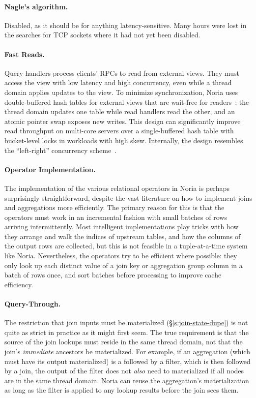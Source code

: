 \paragraph{Nagle's algorithm.} Disabled, as it should be for anything
latency-sensitive. Many hours were lost in the searches for TCP sockets where it
had not yet been disabled.

\paragraph{Fast Reads.}
Query handlers process clients' RPCs to read from external views. They must
access the view with low latency and high concurrency, even while a thread
domain applies updates to the view. To minimize synchronization, Noria uses
double-buffered hash tables for external views that are wait-free for
readers~\cite{evmap}: the thread domain updates one table while read handlers
read the other, and an atomic pointer swap exposes new writes. This design can
significantly improve read throughput on multi-core servers over a
single-buffered hash table with bucket-level locks in workloads with high skew.
Internally, the design resembles the ``left-right'' concurrency
scheme~\cite{left-right}.

\paragraph{Operator Implementation.}
The implementation of the various relational operators in Noria is perhaps
surprisingly straightforward, despite the vast literature on how to implement
joins and aggregations more efficiently. The primary reason for this is that the
operators must work in an incremental fashion with small batches of rows
arriving intermittently. Most intelligent implementations play tricks with how
they arrange and walk the indices of upstream tables, and how the columns of the
output rows are collected, but this is not feasible in a tuple-at-a-time system
like Noria. Nevertheless, the operators try to be efficient where possible: they
only look up each distinct value of a join key or aggregation group column in a
batch of rows once, and sort batches before processing to improve cache
efficiency.

\paragraph{Query-Through.}
The restriction that join inputs must be materialized
(\S\ref{s:join-state-dupe}) is not quite as strict in practice as it might first
seem. The true requirement is that the source of the join lookups must reside in
the same thread domain, not that the join's \emph{immediate} ancestors be
materialized. For example, if an aggregation (which must have its output
materialized) is a followed by a filter, which is then followed by a join, the
output of the filter does not \emph{also} need to materialized if all nodes are
in the same thread domain. Noria can reuse the aggregation's materialization as
long as the filter is applied to any lookup results before the join sees them.
